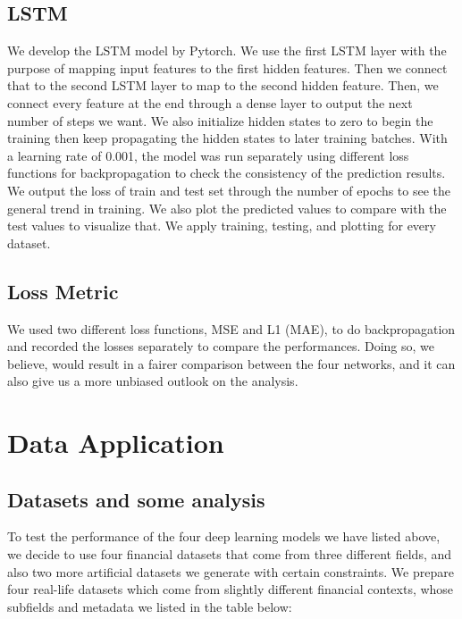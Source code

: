 \documentclass[letterpaper, 10 pt, conference]{ieeeconf}  %
\begin{document}
    \subsection{LSTM}
        We develop the LSTM model by Pytorch. We use the first LSTM layer with the purpose of mapping input features to the first hidden features. Then we connect that to the second LSTM layer to map to the second hidden feature. Then, we connect every feature at the end through a dense layer to output the next number of steps we want. We also initialize hidden states to zero to begin the training then keep propagating the hidden states to later training batches. With a learning rate of 0.001, the model was run separately using different loss functions for backpropagation to check the consistency of the prediction results. We output the loss of train and test set through the number of epochs to see the general trend in training. We also plot the predicted values to compare with the test values to visualize that. We apply training, testing, and plotting for every dataset.

    \subsection{Loss Metric}
        We used two different loss functions, MSE and L1 (MAE), to do backpropagation and recorded the losses separately to compare the performances. Doing so, we believe, would result in a fairer comparison between the four networks, and it can also give us a more unbiased outlook on the analysis.

\section{Data Application}
    \subsection{Datasets and some analysis}
    To test the performance of the four deep learning models we have listed above, we decide to use four financial datasets that come from three different fields, and also two more artificial datasets we generate with certain constraints. We prepare four real-life datasets which come from slightly different financial contexts, whose subfields and metadata we listed in the table below:
\end{document}
